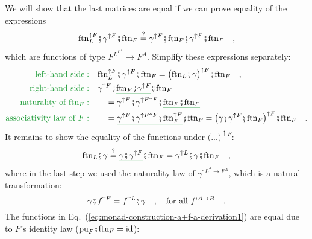 We will show that the last matrices are equal if we can prove equality
of the expressions
\[
\text{ftn}_{L}^{\uparrow F}\bef\gamma^{\uparrow F}\bef\text{ftn}_{F}\overset{?}{=}\gamma^{\uparrow F}\bef\text{ftn}_{F}\bef\gamma^{\uparrow F}\bef\text{ftn}_{F}\quad,
\]
which are functions of type $F^{L^{L^{A}}}\rightarrow F^{A}$. Simplify
these expressions separately:
\begin{align*}
{\color{greenunder}\text{left-hand side}:}\quad & \text{ftn}_{L}^{\uparrow F}\bef\gamma^{\uparrow F}\bef\text{ftn}_{F}=\big(\text{ftn}_{L}\bef\gamma\big)^{\uparrow F}\bef\text{ftn}_{F}\quad,\\
{\color{greenunder}\text{right-hand side}:}\quad & \gamma^{\uparrow F}\bef\gunderline{\text{ftn}_{F}\bef\gamma^{\uparrow F}}\bef\text{ftn}_{F}\\
{\color{greenunder}\text{naturality of }\text{ftn}_{F}:}\quad & \quad=\gamma^{\uparrow F}\bef\gamma^{\uparrow F\uparrow F}\bef\gunderline{\text{ftn}_{F}\bef\text{ftn}_{F}}\\
{\color{greenunder}\text{associativity law of }F:}\quad & \quad=\gunderline{\gamma^{\uparrow F}\bef\gamma^{\uparrow F\uparrow F}\bef\text{ftn}_{F}^{\uparrow F}}\bef\text{ftn}_{F}=\big(\gamma\bef\gamma^{\uparrow F}\bef\text{ftn}_{F}\big)^{\uparrow F}\bef\text{ftn}_{F}\quad.
\end{align*}
It remains to show the equality of the functions under $\big(...\big)^{\uparrow F}$:
\begin{equation}
\text{ftn}_{L}\bef\gamma\overset{?}{=}\gunderline{\gamma\bef\gamma^{\uparrow F}}\bef\text{ftn}_{F}=\gamma^{\uparrow L}\bef\gamma\bef\text{ftn}_{F}\quad,\label{eq:monad-construction-a+f-a-derivation1}
\end{equation}
where in the last step we used the naturality law of $\gamma^{:L^{^{A}}\rightarrow F^{A}}$,
which is a natural transformation:
\[
\gamma\bef f^{\uparrow F}=f^{\uparrow L}\bef\gamma\quad,\quad\text{for all }f^{:A\rightarrow B}\quad.
\]
The functions in Eq.~(\ref{eq:monad-construction-a+f-a-derivation1})
are equal due to $F$\textsf{'}s identity law ($\text{pu}_{F}\bef\text{ftn}_{F}=\text{id}$):
